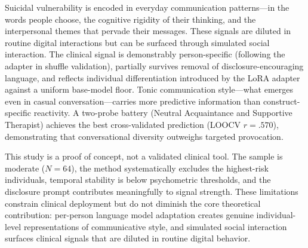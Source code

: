 \documentclass[review,12pt,authoryear]{elsarticle}
\begin{document}
Suicidal vulnerability is encoded in everyday communication patterns---in the words people choose, the cognitive rigidity of their thinking, and the interpersonal themes that pervade their messages. These signals are diluted in routine digital interactions but can be surfaced through simulated social interaction. The clinical signal is demonstrably person-specific (following the adapter in shuffle validation), partially survives removal of disclosure-encouraging language, and reflects individual differentiation introduced by the LoRA adapter against a uniform base-model floor. Tonic communication style---what emerges even in casual conversation---carries more predictive information than construct-specific reactivity. A two-probe battery (Neutral Acquaintance and Supportive Therapist) achieves the best cross-validated prediction (LOOCV $r = .570$), demonstrating that conversational diversity outweighs targeted provocation.

This study is a proof of concept, not a validated clinical tool. The sample is moderate ($N = 64$), the method systematically excludes the highest-risk individuals, temporal stability is below psychometric thresholds, and the disclosure prompt contributes meaningfully to signal strength. These limitations constrain clinical deployment but do not diminish the core theoretical contribution: per-person language model adaptation creates genuine individual-level representations of communicative style, and simulated social interaction surfaces clinical signals that are diluted in routine digital behavior.
\end{document}
